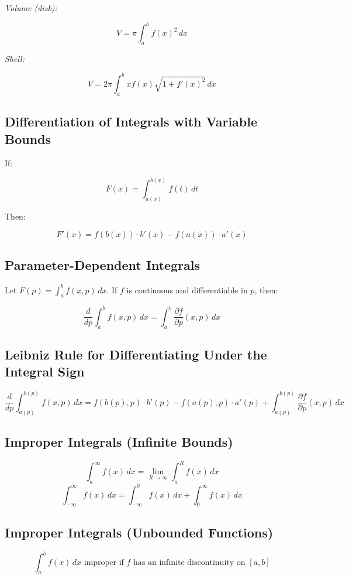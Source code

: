 \emph{Volume (disk):}

\[
    V = \pi \int_a^b {f(x)}^2\,dx
\]

\emph{Shell:}

\[
    V = 2\pi \int_a^b x f(x) \sqrt{1 + {f'(x)}^2}\,dx
\]

\subsection{Differentiation of Integrals with Variable Bounds}

If:

\[
    F(x) = \int_{a(x)}^{b(x)} f(t)\,dt
\]

Then:

\[
    F'(x) = f(b(x)) \cdot b'(x) - f(a(x)) \cdot a'(x)
\]

\subsection{Parameter-Dependent Integrals}

Let \(F(p) = \int_a^b f(x, p)\,dx\). If \(f\) is continuous and differentiable in \(p\), then:

\[
    \frac{d}{dp} \int_a^b f(x, p)\,dx = \int_a^b \frac{\partial f}{\partial p}(x, p)\,dx
\]

\subsection{Leibniz Rule for Differentiating Under the Integral Sign}

\[
    \frac{d}{dp} \int_{a(p)}^{b(p)} f(x, p)\,dx = f(b(p), p) \cdot b'(p) - f(a(p), p) \cdot a'(p) + \int_{a(p)}^{b(p)} \frac{\partial f}{\partial p}(x, p)\,dx
\]

\subsection{Improper Integrals (Infinite Bounds)}

\[
    \int_a^\infty f(x)\,dx = \lim_{R \to \infty} \int_a^R f(x)\,dx
\]
\[
    \int_{-\infty}^\infty f(x)\,dx = \int_{-\infty}^0 f(x)\,dx + \int_0^\infty f(x)\,dx
\]

\subsection{Improper Integrals (Unbounded Functions)}

\[
    \int_a^b f(x)\,dx \text{ improper if } f \text{ has an infinite discontinuity on } [a, b]
\]

